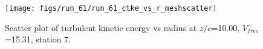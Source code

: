 \begin{figure}[H]
\centering
\texttt{[image: figs/run\_61/run\_61\_ctke\_vs\_r\_meshscatter]}
\caption{Scatter plot of turbulent kinetic energy vs radius at $z/c$=10.00, $V_{free}$=15.31, station 7.}
\label{fig:run_61_ctke_vs_r_meshscatter}
\end{figure}


